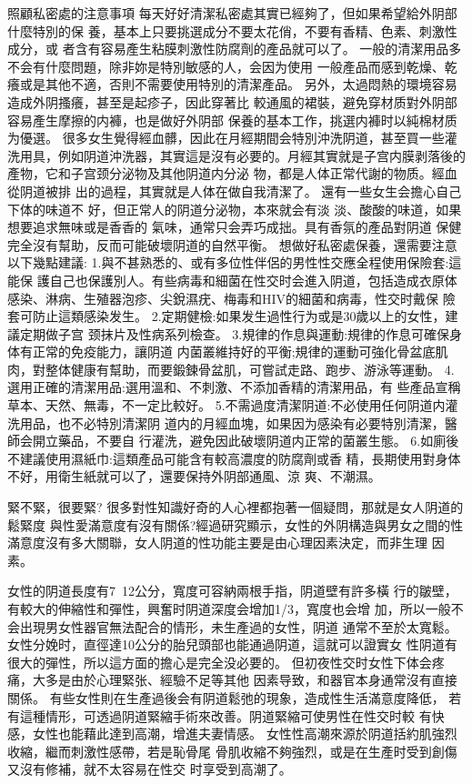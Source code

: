 \documentclass[12pt,UTF8]{ctexbook}
\begin{document}
照顧私密處的注意事項
每天好好清潔私密處其實已經夠了，但如果希望給外阴部什麼特別的保
養，基本上只要挑選成分不要太花俏，不要有香精、色素、刺激性成分，或
者含有容易產生粘膜刺激性防腐劑的產品就可以了。
一般的清潔用品多不会有什麼問題，除非妳是特別敏感的人，会因为使用
一般產品而感到乾燥、乾癢或是其他不適，否則不需要使用特別的清潔產品。
另外，太過悶熱的環境容易造成外阴搔癢，甚至是起疹子，因此穿著比
較通風的裙裝，避免穿材质對外阴部容易產生摩擦的内褲，也是做好外阴部
保養的基本工作，挑選内褲时以純棉材质为優選。
很多女生覺得經血髒，因此在月經期間会特別沖洗阴道，甚至買一些灌
洗用具，例如阴道沖洗器，其實這是沒有必要的。月經其實就是子宫内膜剥落後的產物，它和子宫颈分泌物及其他阴道内分泌
物，都是人体正常代謝的物质。經血從阴道被排
出的過程，其實就是人体在做自我清潔了。
還有一些女生会擔心自己下体的味道不
好，但正常人的阴道分泌物，本來就会有淡
淡、酸酸的味道，如果想要追求無味或是香香的
氣味，通常只会弄巧成拙。具有香氛的產品對阴道
保健完全沒有幫助，反而可能破壞阴道的自然平衡。
想做好私密處保養，還需要注意以下幾點建議:
1.與不甚熟悉的、或有多位性伴侶的男性性交應全程使用保險套:這能保
護自己也保護別人。有些病毒和細菌在性交时会進入阴道，包括造成衣原体
感染、淋病、生殖器泡疹、尖銳濕疣、梅毒和HIV的細菌和病毒，性交时戴保
險套可防止這類感染发生。
2.定期健檢:如果发生過性行为或是30歲以上的女性，建議定期做子宫
颈抹片及性病系列檢查。
3.規律的作息與運動:規律的作息可確保身体有正常的免疫能力，讓阴道
内菌叢維持好的平衡;規律的運動可強化骨盆底肌肉，對整体健康有幫助，而要鍛鍊骨盆肌，可嘗試走路、跑步、游泳等運動。
4.選用正確的清潔用品:選用溫和、不刺激、不添加香精的清潔用品，有
些產品宣稱草本、天然、無毒，不一定比較好。
5.不需過度清潔阴道:不必使用任何阴道内灌洗用品，也不必特別清潔阴
道内的月經血塊，如果因为感染有必要特別清潔，醫師会開立藥品，不要自
行灌洗，避免因此破壞阴道内正常的菌叢生態。
6.如廁後不建議使用濕紙巾:這類產品可能含有較高濃度的防腐劑或香
精，長期使用對身体不好，用衛生紙就可以了，還要保持外阴部通風、涼
爽、不潮濕。

緊不緊，很要緊?
很多對性知識好奇的人心裡都抱著一個疑問，那就是女人阴道的鬆緊度
與性愛滿意度有沒有關係?經過研究顯示，女性的外阴構造與男女之間的性
滿意度沒有多大關聯，女人阴道的性功能主要是由心理因素決定，而非生理
因素。

女性的阴道長度有7~12公分，寬度可容納兩根手指，阴道壁有許多橫
行的皺壁，有較大的伸縮性和彈性，興奮时阴道深度会增加1/3，寬度也会增
加，所以一般不会出現男女性器官無法配合的情形，未生產過的女性，阴道
通常不至於太寬鬆。
女性分娩时，直徑達10公分的胎兒頭部也能通過阴道，這就可以證實女
性阴道有很大的彈性，所以這方面的擔心是完全没必要的。
但初夜性交时女性下体会疼痛，大多是由於心理緊张、經驗不足等其他
因素导致，和器官本身通常沒有直接關係。
有些女性則在生產過後会有阴道鬆弛的現象，造成性生活滿意度降低，
若有這種情形，可透過阴道緊縮手術來改善。阴道緊縮可使男性在性交时較
有快感，女性也能藉此達到高潮，增進夫妻情感。
女性性高潮來源於阴道括約肌強烈收縮，繼而刺激性感帶，若是恥骨尾
骨肌收縮不夠強烈，或是在生產时受到創傷又沒有修補，就不太容易在性交
时享受到高潮了。
\end{document}
